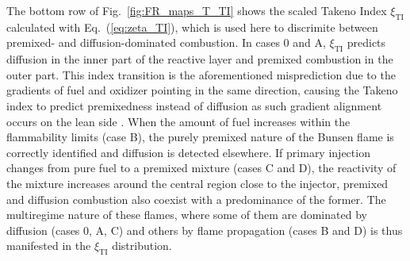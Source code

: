 \documentclass[preprint,12pt,authoryear]{elsarticle}
\begin{document}
{The bottom row of Fig.~\ref{fig:FR_maps_T_TI} shows the scaled Takeno Index $\xi_\mathrm{TI}$ calculated with Eq.~(\ref{eq:zeta_TI}), which is used here to discrimite between 
premixed- and diffusion-dominated combustion. In cases 0 and A, $\xi_\mathrm{TI}$ predicts diffusion in the inner part of the reactive layer and premixed combustion in the outer part. This index transition is the aforementioned misprediction due to the  gradients of fuel and oxidizer pointing in the same direction, causing the Takeno index to predict premixedness instead of diffusion as such gradient alignment occurs on the lean side \citep{fiorina_approximating_2005}. When the amount of fuel increases within the flammability limits (case B), the purely premixed nature of the Bunsen flame is correctly identified and diffusion is detected elsewhere. If primary injection changes from pure fuel to a premixed mixture (cases C and D), the reactivity of the mixture increases around the central region close to the injector, premixed and diffusion combustion also coexist with a predominance of the former. The multiregime nature of these flames,  where some of them are dominated by diffusion (cases 0, A, C) and others by flame propagation (cases B and D) 
is thus manifested in the $\xi_\mathrm{TI}$ distribution.



    



}
\end{document}
